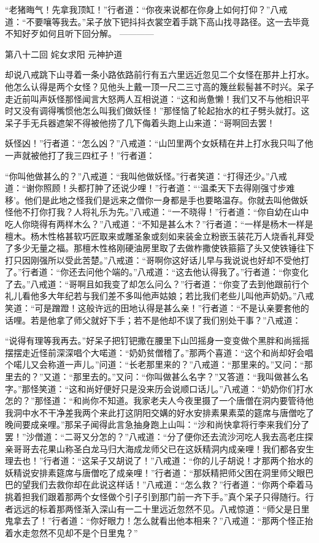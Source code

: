 \documentclass[12pt,UTF8]{ctexbook}
\begin{document}
{	“老猪晦气！先拿我顶缸！”行者道：“你夜来说都在你身上如何打仰？”八戒道：“不要嚷等我去。”呆子放下钯抖抖衣裳空着手跳下高山找寻路径。这一去毕竟不知好歹如何且听下回分解。
	------------
	
	第八十二回 姹女求阳 元神护道
	
	却说八戒跳下山寻着一条小路依路前行有五六里远近忽见二个女怪在那井上打水。他怎么认得是两个女怪？见他头上戴一顶一尺二三寸高的篾丝鬏髻甚不时兴。呆子走近前叫声妖怪那怪闻言大怒两人互相说道：“这和尚惫懒！我们又不与他相识平时又没有调得嘴惯他怎么叫我们做妖怪！”那怪恼了轮起抬水的杠子劈头就打。这呆子手无兵器遮架不得被他捞了几下侮着头跑上山来道：“哥啊回去罢！
	
	妖怪凶！”行者道：“怎么凶？”八戒道：“山凹里两个女妖精在井上打水我只叫了他一声就被他打了我三四杠子！”行者道：
	
	“你叫他做甚么的？”八戒道：“我叫他做妖怪。”行者笑道：“打得还少。”八戒道：“谢你照顾！头都打肿了还说少哩！”行者道：“‘温柔天下去得刚强寸步难移’。他们是此地之怪我们是远来之僧你一身都是手也要略温存。你就去叫他做妖怪他不打你打我？人将礼乐为先。”八戒道：“一不晓得！”行者道：“你自幼在山中吃人你晓得有两样木么？”八戒道：“不知是甚么木？”行者道：“一样是杨木一样是檀木。杨木性格甚软巧匠取来或雕圣象或刻如来装金立粉嵌玉装花万人烧香礼拜受了多少无量之福。那檀木性格刚硬油房里取了去做柞撒使铁箍箍了头又使铁锤往下打只因刚强所以受此苦楚。”八戒道：“哥啊你这好话儿早与我说说也好却不受他打了。”行者道：“你还去问他个端的。”八戒道：“这去他认得我了。”行者道：“你变化了去。”八戒道：“哥啊且如我变了却怎么问么？”行者道：“你变了去到他跟前行个礼儿看他多大年纪若与我们差不多叫他声姑娘；若比我们老些儿叫他声奶奶。”八戒笑道：“可是蹭蹬！这般许远的田地认得是甚么亲！”行者道：“不是认亲要套他的话哩。若是他拿了师父就好下手；若不是他却不误了我们别处干事？”八戒道：
	
	“说得有理等我再去。”好呆子把钉钯撒在腰里下山凹摇身一变变做个黑胖和尚摇摇摆摆走近怪前深深唱个大喏道：“奶奶贫僧稽了。”那两个喜道：“这个和尚却好会唱个喏儿又会称道一声儿。”问道：“长老那里来的？”八戒道：“那里来的。”又问：“那里去的？”又道：“那里去的。”又问：“你叫做甚么名字？”又答道：“我叫做甚么名字。”那怪笑道：“这和尚好便好只是没来历会说顺口话儿。”八戒道：“奶奶你们打水怎的？”那怪道：“和尚你不知道。我家老夫人今夜里摄了一个唐僧在洞内要管待他我洞中水不干净差我两个来此打这阴阳交媾的好水安排素果素菜的筵席与唐僧吃了晚间要成亲哩。”那呆子闻得此言急抽身跑上山叫：“沙和尚快拿将行李来我们分了罢！”沙僧道：“二哥又分怎的？”八戒道：“分了便你还去流沙河吃人我去高老庄探亲哥哥去花果山称圣白龙马归大海成龙师父已在这妖精洞内成亲哩！我们都各安生理去也！”行者道：“这呆子又胡说了！”八戒道：“你的儿子胡说！才那两个抬水的妖精说安排素筵席与唐僧吃了成亲哩！”行者道：“那妖精把师父困在洞里师父眼巴巴的望我们去救你却在此说这样话！”八戒道：“怎么救？”行者道：“你两个牵着马挑着担我们跟着那两个女怪做个引子引到那门前一齐下手。”真个呆子只得随行。行者远远的标着那两怪渐入深山有一二十里远近忽然不见。八戒惊道：“师父是日里鬼拿去了！”行者道：“你好眼力！怎么就看出他本相来？”八戒道：“那两个怪正抬着水走忽然不见却不是个日里鬼？”
	
}
\end{document}
